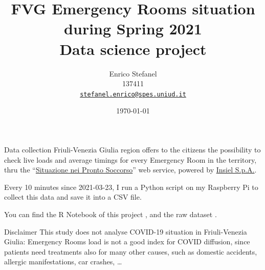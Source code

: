 \documentclass[8pt,english,aspectratio=169]{beamer}
\title[FVG Emergency Rooms situation]{FVG Emergency Rooms situation\\during Spring 2021\\\smallskip \small Data science project}
\author[\href{mailto:stefanel.enrico@spes.uniud.it}{Enrico Stefanel}]{Enrico Stefanel\\137411\\\href{mailto:stefanel.enrico@spes.uniud.it}{\texttt{stefanel.enrico@spes.uniud.it}}}
\date{\today}
\begin{document}
\begin{frame}
  \titlepage
\end{frame}

\begin{frame}{Data collection}
Friuli-Venezia Giulia region offers to the citizens the possibility to check live loads and average timings for every Emergency Room in the territory, thru the ``\href{https://servizionline.sanita.fvg.it/psonline}{Situazione nei Pronto Soccorso}'' web service, powered by \href{https://www.insiel.it/}{Insiel S.p.A.}.

Every 10 minutes since 2021-03-23, I run a Python script on my Raspberry Pi to collect this data and save it into a CSV file.

\medskip
\begin{center}
\end{center}
\bigskip

You can find the R Notebook of this project \href{http://uniud.enricostefanel.it/datascience/project/FVG_emergency_rooms_situation.html}{\color{gray}{at this link}}, and the raw dataset \href{https://www.kaggle.com/enstit/friuli-venezia-giulia-emergency-rooms-situation}{\color{gray}{here}}.

\begin{block}{Disclaimer}
This study does not analyse COVID-19 situation in Friuli-Venezia Giulia: Emergency Rooms load is not a good index for COVID diffusion, since patients need treatments also for many other causes, such as domestic accidents, allergic manifestations, car crashes, \dots 
\end{block}

\end{frame}
\end{document}
